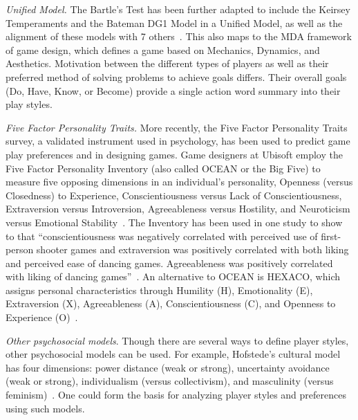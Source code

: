 \documentclass{sig-alternate-05-2015}
\begin{document}
{\em Unified Model. }The Bartle's Test has been further adapted to include the Keirsey Temperaments and the Bateman DG1 Model in a Unified Model, as well as the alignment of these models with 7 others~\cite{stewart11}. This also maps to the MDA framework of game design, which defines a game based on Mechanics, Dynamics, and Aesthetics. Motivation between the different types of players as well as their preferred method of solving problems to achieve goals differs. Their overall goals (Do, Have, Know, or Become) provide a single action word summary into their play styles.



{\em Five Factor Personality Traits}{\em . }More recently, the Five Factor Personality Traits survey, a validated instrument used in psychology, has been used to predict game play preferences and in designing games. Game designers at Ubisoft employ the Five Factor Personality Inventory (also called OCEAN or the Big Five) to measure five opposing dimensions in an individual's personality, Openness (versus Closedness) to Experience, Conscientiousness versus Lack of Conscientiousness, Extraversion versus Introversion, Agreeableness versus Hostility, and Neuroticism versus Emotional Stability~\cite{vandenberghe12fivedomains}. The Inventory has been used in one study to show to that ``conscientiousness was negatively correlated with perceived use of first-person shooter games and extraversion was positively correlated with both liking and perceived ease of dancing games. Agreeableness was positively correlated with liking of dancing games''~\cite{degraft2013relating}. An alternative to OCEAN is HEXACO, which assigns personal characteristics through Humility (H), Emotionality (E), Extraversion (X), Agreeableness (A), Conscientiousness (C), and Openness to Experience (O)~\cite{lee04psychometric}.



{\em Other psychosocial models}. Though there are several ways to define player styles, other psychosocial models can be used. For example, Hofstede's cultural model has four dimensions: power distance (weak or strong), uncertainty avoidance (weak or strong), individualism (versus collectivism), and masculinity (versus feminism)~\cite{hofstede11dimensionalizing}. One could form the basis for analyzing player styles and preferences using such models. 
\end{document}
